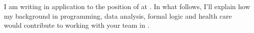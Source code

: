 I am writing in application to the position of \position{} at \companyname{}. In what follows, I'll explain how my background in programming, data analysis, formal logic and health care would contribute to working with your team in \city{}. 
